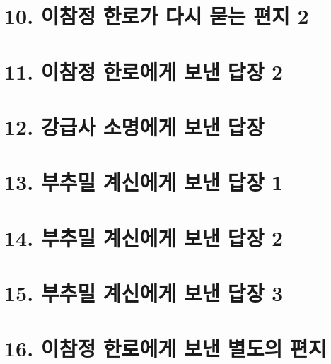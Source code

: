 \documentclass[12pt, a4paper, oneside]{book}
\let\stdsection\section
\renewcommand\section{\newpage\stdsection}
\begin{document}
	\section{10. 이참정 한로가 다시 묻는 편지 2}

%
	\section{11. 이참정 한로에게 보낸 답장 2 }

%
	\section{12. 강급사 소명에게 보낸 답장 }

%
	\section{13. 부추밀 계신에게 보낸 답장 1}

%
	\section{14. 부추밀 계신에게 보낸 답장 2}

%
	\section{15. 부추밀 계신에게 보낸 답장 3}


%
	\section{16. 이참정 한로에게 보낸 별도의 편지 }
\end{document}

